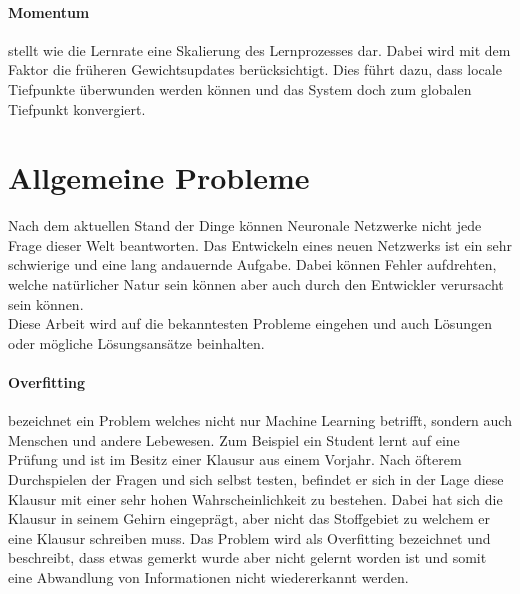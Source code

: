 \paragraph{Momentum} stellt wie die Lernrate eine Skalierung des Lernprozesses dar.
Dabei wird mit dem Faktor die früheren Gewichtsupdates berücksichtigt. 
Dies führt dazu, dass locale Tiefpunkte überwunden werden können und das System doch zum globalen Tiefpunkt konvergiert.

\section{Allgemeine Probleme}
\label{sec:AllgeProb}

Nach dem aktuellen Stand der Dinge können Neuronale Netzwerke nicht jede Frage dieser Welt beantworten.
Das Entwickeln eines neuen Netzwerks ist ein sehr schwierige und eine lang andauernde Aufgabe. 
Dabei können Fehler aufdrehten, welche natürlicher Natur sein können aber auch durch den Entwickler verursacht sein können. \\


\noindent
Diese Arbeit wird auf die bekanntesten Probleme eingehen und auch Lösungen oder mögliche Lösungsansätze beinhalten. 


\paragraph{Overfitting} bezeichnet ein Problem welches nicht nur Machine Learning betrifft, sondern auch Menschen und andere Lebewesen. 
Zum Beispiel ein Student lernt auf eine Prüfung und ist im Besitz einer Klausur aus einem Vorjahr. 
Nach öfterem Durchspielen der Fragen und sich selbst testen, befindet er sich in der Lage diese Klausur mit einer sehr hohen Wahrscheinlichkeit zu bestehen. 
Dabei hat sich die Klausur in seinem Gehirn eingeprägt, aber nicht das Stoffgebiet zu welchem er eine Klausur schreiben muss. 
Das Problem wird als Overfitting bezeichnet und beschreibt, dass etwas gemerkt wurde aber nicht gelernt worden ist und somit eine Abwandlung von Informationen nicht wiedererkannt werden.

